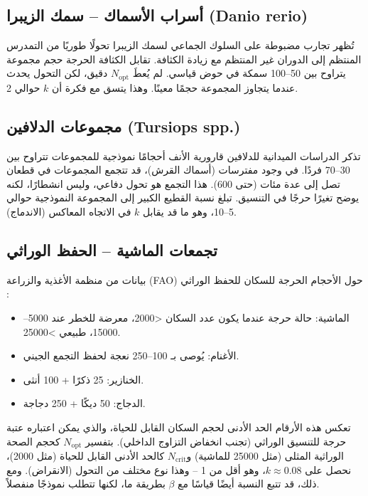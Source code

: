\documentclass[12pt]{article}
\theoremstyle{remark}
\begin{document}
	\subsection{أسراب الأسماك – سمك الزيبرا (Danio rerio)}
	\label{subsec:fish}
	
	تُظهر تجارب مضبوطة على السلوك الجماعي لسمك الزيبرا \cite{Tunstrom2013} تحولًا طوريًا من التمدرس المنتظم إلى الدوران غير المنتظم مع زيادة الكثافة. تقابل الكثافة الحرجة حجم مجموعة يتراوح بين 50–100 سمكة في حوض قياسي. لم يُعطَ \(N_{\text{opt}}\) دقيق، لكن التحول يحدث عندما يتجاوز المجموعة حجمًا معينًا. وهذا يتسق مع فكرة أن \(k\) حوالي 2.
	
	\subsection{مجموعات الدلافين (Tursiops spp.)}
	\label{subsec:dolphins}
	
	تذكر الدراسات الميدانية للدلافين قارورية الأنف \cite{Connor2000} أحجامًا نموذجية للمجموعات تتراوح بين 30–70 فردًا. في وجود مفترسات (أسماك القرش)، قد تتجمع المجموعات في قطعان تصل إلى عدة مئات (حتى 600). هذا التجمع هو تحول دفاعي، وليس انشطارًا، لكنه يوضح تغيرًا حرجًا في التنسيق. تبلغ نسبة القطيع الكبير إلى المجموعة النموذجية حوالي 5–10، وهو ما قد يقابل \(k\) في الاتجاه المعاكس (الاندماج).
	
	\subsection{تجمعات الماشية – الحفظ الوراثي}
	\label{subsec:livestock}
	
	بيانات من منظمة الأغذية والزراعة (FAO) حول الأحجام الحرجة للسكان للحفظ الوراثي \cite{FAO2013}:
	\begin{itemize}
		\item الماشية: حالة حرجة عندما يكون عدد السكان <2000، معرضة للخطر عند 5000–15000، طبيعي >25000.
		\item الأغنام: يُوصى بـ 100–250 نعجة لحفظ التجمع الجيني.
		\item الخنازير: 25 ذكرًا + 100 أنثى.
		\item الدجاج: 50 ديكًا + 250 دجاجة.
	\end{itemize}
	تعكس هذه الأرقام الحد الأدنى لحجم السكان القابل للحياة، والذي يمكن اعتباره عتبة حرجة للتنسيق الوراثي (تجنب انخفاض التزاوج الداخلي). بتفسير \(N_{\text{opt}}\) كحجم الصحة الوراثية المثلى (مثل 25000 للماشية) و\(N_{\text{crit}}\) كالحد الأدنى القابل للحياة (مثل 2000)، نحصل على \(k \approx 0.08\)، وهو أقل من 1 – وهذا نوع مختلف من التحول (الانقراض). ومع ذلك، قد تتبع النسبة أيضًا قياسًا مع \(\beta\) بطريقة ما، لكنها تتطلب نموذجًا منفصلاً.
	
\end{document}

